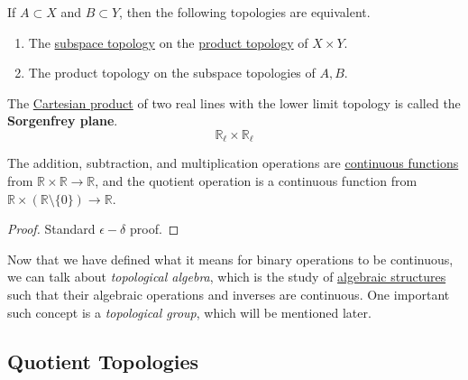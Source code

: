   \begin{theorem}
    \label{thm:subspace-of-products-and-products-of-subspaces}
    If $A \subset X$ and $B \subset Y$, then the following topologies are equivalent. 
    \begin{enumerate}
      \item The \hyperref[def:subspace-topology]{subspace topology} on the \hyperref[def:product-topology]{product topology} of $X \times Y$. 
      \item The product topology on the subspace topologies of $A, B$. 
    \end{enumerate}
  \end{theorem}

  \begin{example}
    \label{ex:sorgenfrey-plane}
    The \hyperref[st-def:cart-prod-2]{Cartesian product} of two real lines with the lower limit topology is called the \textbf{Sorgenfrey plane}. 
    \begin{equation}
      \mathbb{R}_\ell \times \mathbb{R}_\ell
    \end{equation}
  \end{example}

  \begin{lemma}
    \label{thm:continuity-of-the-field-operations}
    The addition, subtraction, and multiplication operations are \hyperref[def:continuous_func]{continuous functions} from $\mathbb{R} \times \mathbb{R} \to \mathbb{R}$, and the quotient operation is a continuous function from $\mathbb{R} \times (\mathbb{R} \setminus \{0\}) \to \mathbb{R}$. 
  \end{lemma}
  \begin{proof}
    Standard $\epsilon-\delta$ proof. 
  \end{proof}

  Now that we have defined what it means for binary operations to be continuous, we can talk about \textit{topological algebra}, which is the study of \hyperref[alg-def:algebraic-structure]{algebraic structures} such that their algebraic operations and inverses are continuous. One important such concept is a \textit{topological group}, which will be mentioned later. 

\subsection{Quotient Topologies} 

